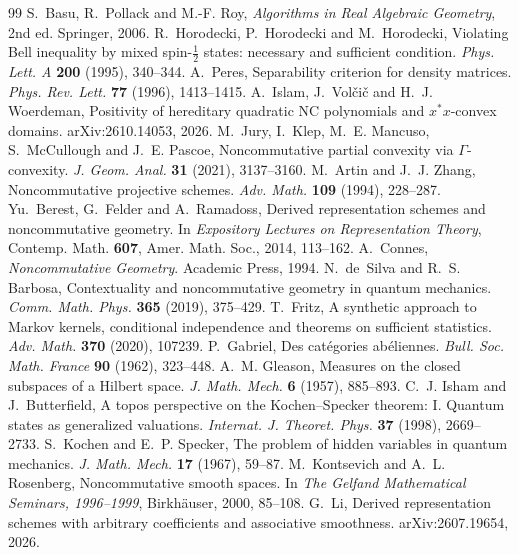 \documentclass[11pt]{article}
\theoremstyle{definition}\newtheorem{definition}[theorem]{Definition}\newtheorem{remark}[theorem]{Remark}\newtheorem{example}[theorem]{Example}
\begin{document}
\begin{thebibliography}{99}
 S.~Basu, R.~Pollack and M.-F. Roy, \emph{Algorithms in Real Algebraic Geometry}, 2nd ed. Springer, 2006.
 R.~Horodecki, P.~Horodecki and M.~Horodecki, Violating Bell inequality by mixed spin-$\frac12$ states: necessary
  and sufficient condition. \emph{Phys. Lett. A} \textbf{200} (1995), 340--344.
 A.~Peres, Separability criterion for density matrices. \emph{Phys. Rev. Lett.} \textbf{77} (1996), 1413--1415.
 A.~Islam, J.~Volčič and H.~J. Woerdeman, Positivity of hereditary quadratic NC polynomials and $x^*x$-convex domains.
  arXiv:2610.14053, 2026.
 M.~Jury, I.~Klep, M.~E. Mancuso, S.~McCullough and J.~E. Pascoe, Noncommutative partial convexity via $\Gamma$-convexity.
  \emph{J. Geom. Anal.} \textbf{31} (2021), 3137--3160.
 M.~Artin and J.~J. Zhang, Noncommutative projective schemes. \emph{Adv. Math.} \textbf{109} (1994), 228--287.
 Yu.~Berest, G.~Felder and A.~Ramadoss, Derived representation schemes and noncommutative geometry. In
  \emph{Expository Lectures on Representation Theory}, Contemp. Math. \textbf{607}, Amer. Math. Soc., 2014, 113--162.
 A.~Connes, \emph{Noncommutative Geometry}. Academic Press, 1994.
 N.~de~Silva and R.~S. Barbosa, Contextuality and noncommutative geometry in quantum mechanics. \emph{Comm. Math.
  Phys.} \textbf{365} (2019), 375--429.
 T.~Fritz, A synthetic approach to Markov kernels, conditional independence and theorems on sufficient statistics.
  \emph{Adv. Math.} \textbf{370} (2020), 107239.
 P.~Gabriel, Des cat\'egories ab\'eliennes. \emph{Bull. Soc. Math. France} \textbf{90} (1962), 323--448.
 A.~M. Gleason, Measures on the closed subspaces of a Hilbert space. \emph{J. Math. Mech.} \textbf{6} (1957), 885--893.
 C.~J. Isham and J.~Butterfield, A topos perspective on the Kochen--Specker theorem: I. Quantum states as
  generalized valuations. \emph{Internat. J. Theoret. Phys.} \textbf{37} (1998), 2669--2733.
 S.~Kochen and E.~P. Specker, The problem of hidden variables in quantum mechanics. \emph{J. Math. Mech.}
  \textbf{17} (1967), 59--87.
 M.~Kontsevich and A.~L. Rosenberg, Noncommutative smooth spaces. In \emph{The Gelfand Mathematical Seminars,
  1996--1999}, Birkh\"auser, 2000, 85--108.
 G.~Li, Derived representation schemes with arbitrary coefficients and associative smoothness. arXiv:2607.19654, 2026.

\end{thebibliography}
\end{document}
